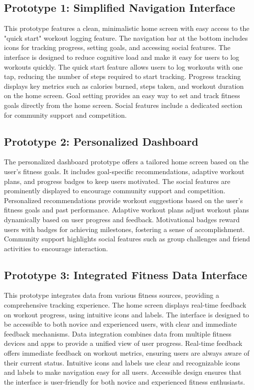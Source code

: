 \documentclass[
	letterpaper, %
]{jdf}
\begin{document}
\subsection{Prototype 1: Simplified Navigation Interface}
This prototype features a clean, minimalistic home screen with easy access to the "quick start" workout logging feature. The navigation bar at the bottom includes icons for tracking progress, setting goals, and accessing social features. The interface is designed to reduce cognitive load and make it easy for users to log workouts quickly. The quick start feature allows users to log workouts with one tap, reducing the number of steps required to start tracking. Progress tracking displays key metrics such as calories burned, steps taken, and workout duration on the home screen. Goal setting provides an easy way to set and track fitness goals directly from the home screen. Social features include a dedicated section for community support and competition.

\subsection {Prototype 2: Personalized Dashboard}
The personalized dashboard prototype offers a tailored home screen based on the user's fitness goals. It includes goal-specific recommendations, adaptive workout plans, and progress badges to keep users motivated. The social features are prominently displayed to encourage community support and competition. Personalized recommendations provide workout suggestions based on the user's fitness goals and past performance. Adaptive workout plans adjust workout plans dynamically based on user progress and feedback. Motivational badges reward users with badges for achieving milestones, fostering a sense of accomplishment. Community support highlights social features such as group challenges and friend activities to encourage interaction.

\subsection {Prototype 3: Integrated Fitness Data Interface}
This prototype integrates data from various fitness sources, providing a comprehensive tracking experience. The home screen displays real-time feedback on workout progress, using intuitive icons and labels. The interface is designed to be accessible to both novice and experienced users, with clear and immediate feedback mechanisms. Data integration combines data from multiple fitness devices and apps to provide a unified view of user progress. Real-time feedback offers immediate feedback on workout metrics, ensuring users are always aware of their current status. Intuitive icons and labels use clear and recognizable icons and labels to make navigation easy for all users. Accessible design ensures that the interface is user-friendly for both novice and experienced fitness enthusiasts.
\newpage
\end{document}
